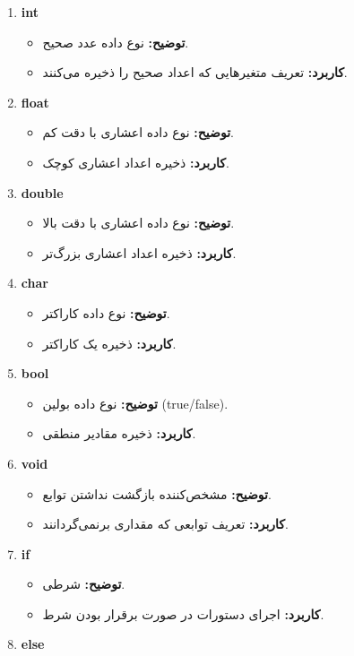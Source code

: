 \documentclass[12pt, a4paper]{report}
\begin{document}
\begin{enumerate}
	\item \textbf{int}
	\begin{itemize}
		\item \textbf{توضیح:} نوع داده عدد صحیح.
		\item \textbf{کاربرد:} تعریف متغیرهایی که اعداد صحیح را ذخیره می‌کنند.
	\end{itemize}
	\item \textbf{float}
	\begin{itemize}
		\item \textbf{توضیح:} نوع داده اعشاری با دقت کم.
		\item \textbf{کاربرد:} ذخیره اعداد اعشاری کوچک.
	\end{itemize}
	\item \textbf{double}
	\begin{itemize}
		\item \textbf{توضیح:} نوع داده اعشاری با دقت بالا.
		\item \textbf{کاربرد:} ذخیره اعداد اعشاری بزرگ‌تر.
	\end{itemize}
	\item \textbf{char}
	\begin{itemize}
		\item \textbf{توضیح:} نوع داده کاراکتر.
		\item \textbf{کاربرد:} ذخیره یک کاراکتر.
	\end{itemize}
	\item \textbf{bool}
	\begin{itemize}
		\item \textbf{توضیح:} نوع داده بولین (true/false).
		\item \textbf{کاربرد:} ذخیره مقادیر منطقی.
	\end{itemize}
	\item \textbf{void}
	\begin{itemize}
		\item \textbf{توضیح:} مشخص‌کننده بازگشت نداشتن توابع.
		\item \textbf{کاربرد:} تعریف توابعی که مقداری برنمی‌گردانند.
	\end{itemize}
	\item \textbf{if}
	\begin{itemize}
		\item \textbf{توضیح:} شرطی.
		\item \textbf{کاربرد:} اجرای دستورات در صورت برقرار بودن شرط.
	\end{itemize}
	\item \textbf{else}

\end{enumerate}
\end{document}
